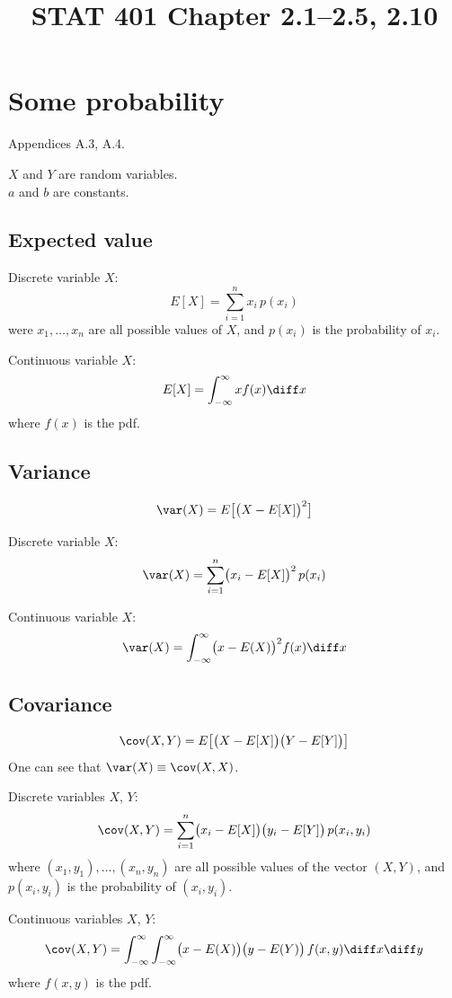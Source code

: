 \documentclass[12pt]{article}
\begin{document}
\title{STAT 401 Chapter 2.1--2.5, 2.10}
\maketitle

\section{Some probability}

Appendices A.3, A.4.

$X$ and $Y$ are random variables.\\
$a$ and $b$ are constants.

\subsection{Expected value}

Discrete variable $X$:
\[
E[X] = \sum_{i=1}^n x_i \, p(x_i)
\]
were $x_1,\dotsc,x_n$ are all possible values of $X$,
and $p(x_i)$ is the probability of $x_i$.

Continuous variable $X$:
\[
E[X] = \int_{-\infty}^{\infty} x f(x)\diff x
\]
where $f(x)$ is the pdf.

\subsection{Variance}

\[
\var(X) = E\bigl[\bigl(X - E[X]\bigr)^2\bigr]
\]

Discrete variable $X$:
\[
\var(X) = \sum_{i=1}^n \bigl(x_i - E[X]\bigr)^2\, p(x_i)
\]

Continuous variable $X$:
\[
\var(X) = \int_{-\infty}^{\infty} \bigl(x - E(X)\bigr)^2 f(x)
    \diff x
\]


\subsection{Covariance}

\[
\cov(X,Y) = E\bigl[\bigl(X - E[X]\bigr)\bigl(Y - E[Y]\bigr)\bigr]
\]
One can see that $\var(X) \equiv \cov(X,X)$.

Discrete variables $X$, $Y$:
\[
\cov(X,Y) = \sum_{i=1}^n
    \bigl(x_i - E[X]\bigr)
    \bigl(y_i - E[Y]\bigr)
    \,p(x_i, y_i)
\]
where $(x_1,y_1),\dotsc,(x_n,y_n)$ are all possible values
of the vector $(X,Y)$,
and $p(x_i,y_i)$ is the probability of $(x_i,y_i)$.

Continuous variables $X$, $Y$:
\[
\cov(X,Y) = \int_{-\infty}^{\infty}
    \int_{-\infty}^{\infty}
        \bigl(x - E(X)\bigr)
        \bigl(y - E(Y)\bigr)
        \, f(x,y)
        \diff x \diff y
\]
where $f(x,y)$ is the pdf.
\end{document}
